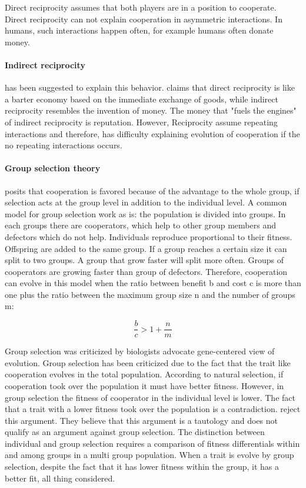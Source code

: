 \documentclass[12pt]{extarticle}
\begin{document}
Direct reciprocity assumes that both players are in a position to cooperate. Direct reciprocity can not explain cooperation in asymmetric interactions. In humans, such interactions happen often, for example humans often donate money. 

\paragraph{Indirect reciprocity} has been suggested to explain this behavior.
\citet{nowak2006five} claims that direct reciprocity is like a barter economy based on the immediate exchange of goods, while indirect reciprocity resembles the invention of money. The money that "fuels the engines" of indirect reciprocity is reputation. 
However, Reciprocity assume repeating interactions and therefore, has difficulty explaining evolution of cooperation if the no repeating interactions occurs. 

\paragraph{Group selection theory} posits that cooperation is favored because of the advantage to the whole group, if selection acts at the group level in addition to the individual level. A common model for group selection work as is: the population is divided into groups. In each groups there are cooperators, which help to other group members and defectors which do not help.  %
Individuals reproduce proportional to their fitness. Offspring are added to the same group.
If a group reaches a certain size it can split to two groups. A group that grow faster will split more often. Groups of cooperators are growing faster than group of defectors.
Therefore, cooperation can evolve in this model when the ratio between benefit b and cost c is more than one plus the ratio between the maximum group size n and the number of groups m:

\begin{equation} \label{eq:groupselection}
\frac{b}{c}>1+\frac{n}{m}
\end{equation}

Group selection was criticized by biologists advocate gene-centered view of evolution. Group selection has been criticized due to the fact that the trait like cooperation evolves in the total population. According to natural selection, if cooperation took over the population it must have better fitness. However, in group selection the fitness of cooperator in the individual level is lower. The fact that a trait with a lower fitness took over the population is a contradiction. \citet{eldakar2011eight} reject this argument. They believe that this argument is a tautology and does not qualify as an argument against group selection. The distinction between individual and group selection requires a comparison of fitness differentials within and among groups in a multi group population. When a trait is evolve by group selection, despite the fact that it has lower fitness within the group, it has a better fit, all thing considered. 
\end{document}

